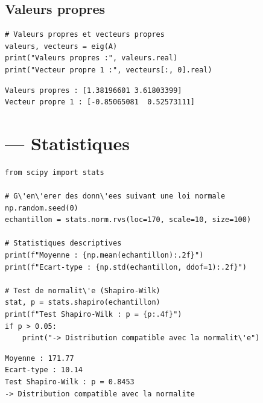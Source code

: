 \subsection{Valeurs propres}

\begin{codeblock}[title=\textbf{Python}]
\begin{verbatim}
# Valeurs propres et vecteurs propres
valeurs, vecteurs = eig(A)
print("Valeurs propres :", valeurs.real)
print("Vecteur propre 1 :", vecteurs[:, 0].real)
\end{verbatim}
\end{codeblock}

\begin{codeoutput}
\begin{verbatim}
Valeurs propres : [1.38196601 3.61803399]
Vecteur propre 1 : [-0.85065081  0.52573111]
\end{verbatim}
\end{codeoutput}

\section{ --- Statistiques}

\begin{codeblock}[title=\textbf{Python}]
\begin{verbatim}
from scipy import stats

# G\'en\'erer des donn\'ees suivant une loi normale
np.random.seed(0)
echantillon = stats.norm.rvs(loc=170, scale=10, size=100)

# Statistiques descriptives
print(f"Moyenne : {np.mean(echantillon):.2f}")
print(f"Ecart-type : {np.std(echantillon, ddof=1):.2f}")

# Test de normalit\'e (Shapiro-Wilk)
stat, p = stats.shapiro(echantillon)
print(f"Test Shapiro-Wilk : p = {p:.4f}")
if p > 0.05:
    print("-> Distribution compatible avec la normalit\'e")
\end{verbatim}
\end{codeblock}

\begin{codeoutput}
\begin{verbatim}
Moyenne : 171.77
Ecart-type : 10.14
Test Shapiro-Wilk : p = 0.8453
-> Distribution compatible avec la normalite
\end{verbatim}
\end{codeoutput}

